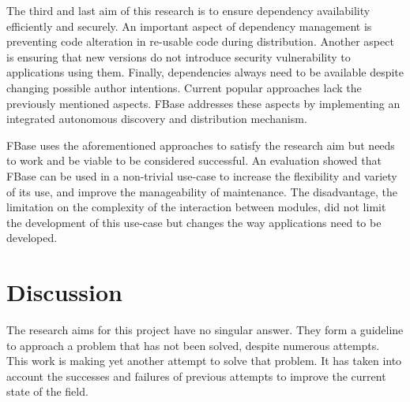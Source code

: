The third and last aim of this research is to ensure dependency availability efficiently and securely. An important aspect of dependency management is preventing code alteration in re-usable code during distribution. Another aspect is ensuring that new versions do not introduce security vulnerability to applications using them. Finally, dependencies always need to be available despite changing possible author intentions. Current popular approaches lack the previously mentioned aspects. FBase addresses these aspects by implementing an integrated autonomous discovery and distribution mechanism.

FBase uses the aforementioned approaches to satisfy the research aim but needs to work and be viable to be considered successful. An evaluation showed that FBase can be used in a non-trivial use-case to increase the flexibility and variety of its use, and improve the manageability of maintenance. The disadvantage, the limitation on the complexity of the interaction between modules, did not limit the development of this use-case but changes the way applications need to be developed.

\section{Discussion}
The research aims for this project have no singular answer. They form a guideline to approach a problem that has not been solved, despite numerous attempts. This work is making yet another attempt to solve that problem. It has taken into account the successes and failures of previous attempts to improve the current state of the field.

